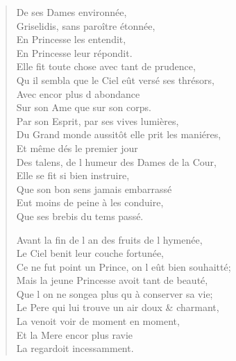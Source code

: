 \begin{verse}
\vin De ses Dames environnée, \\
\vin Griselidis, sans paroître étonnée, \\
\vin En Princesse les entendit, \\
\vin En Princesse leur répondit. \\
Elle fit toute chose avec tant de prudence, \\
Qu\textquotesingle{} il sembla que le Ciel eût versé ses thrésors, \\
\vin Avec encor plus d\textquotesingle{} abondance \\
\vin Sur son Ame que sur son corps. \\
\vin Par son Esprit, par ses vives lumières, \\
Du Grand monde aussitôt elle prit les maniéres, \\
\vin Et même dés le premier jour \\
Des talens, de l\textquotesingle{} humeur des Dames de la Cour, \\
\vin Elle se fit si bien instruire, \\
\vin Que son bon sens jamais embarrassé \\
\vin Eut moins de peine à les conduire, \\
\vin Que ses brebis du tems passé.

Avant la fin de l\textquotesingle{} an des fruits de l\textquotesingle{} hymenée, \\
\vin Le Ciel benit leur couche fortunée, \\
Ce ne fut point un Prince, on l\textquotesingle{} eût bien souhaitté; \\
Mais la jeune Princesse avoit tant de beauté, \\
Que l\textquotesingle{} on ne songea plus qu\textquotesingle{} à conserver sa vie; \\
Le Pere qui lui trouve un air doux \& charmant, \\
\vin La venoit voir de moment en moment, \\
\vin Et la Mere encor plus ravie \\
\vin La regardoit incessamment.


\end{verse}
